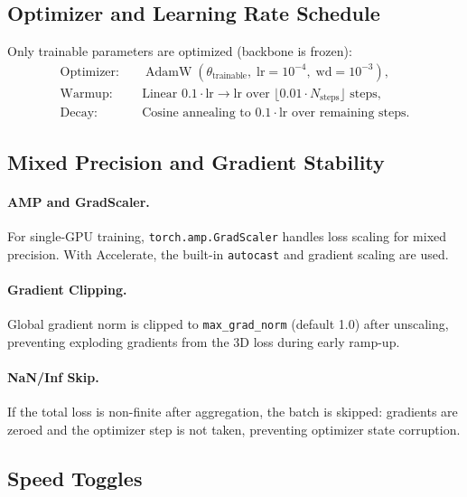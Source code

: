 \documentclass[runningheads]{llncs}
\newcommand{\op}[1]{\operatorname{#1}}
\begin{document}
\subsection{Optimizer and Learning Rate Schedule}

Only trainable parameters are optimized (backbone is frozen):
\begin{align}
    \text{Optimizer:}& \quad \op{AdamW}(\theta_{\text{trainable}},\; \text{lr} = 10^{-4},\; \text{wd} = 10^{-3}), \label{eq:optimizer} \\
    \text{Warmup:}& \quad \text{Linear } 0.1 \cdot \text{lr} \to \text{lr} \text{ over } \lfloor 0.01 \cdot N_{\text{steps}} \rfloor \text{ steps}, \label{eq:warmup} \\
    \text{Decay:}& \quad \text{Cosine annealing to } 0.1 \cdot \text{lr} \text{ over remaining steps}. \label{eq:cosine}
\end{align}

\subsection{Mixed Precision and Gradient Stability}

\paragraph{AMP and GradScaler.}  For single-GPU training, \texttt{torch.amp.GradScaler} handles loss scaling for mixed precision.  With Accelerate, the built-in \texttt{autocast} and gradient scaling are used.

\paragraph{Gradient Clipping.}  Global gradient norm is clipped to \texttt{max\_grad\_norm} (default 1.0) after unscaling, preventing exploding gradients from the 3D loss during early ramp-up.

\paragraph{NaN/Inf Skip.}  If the total loss is non-finite after aggregation, the batch is skipped: gradients are zeroed and the optimizer step is not taken, preventing optimizer state corruption.

\subsection{Speed Toggles}
\end{document}
